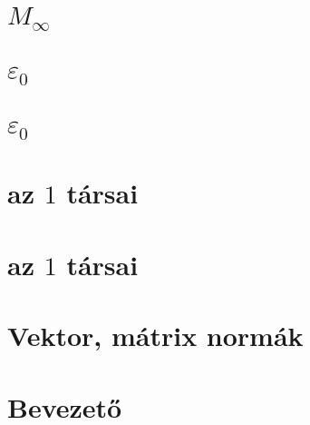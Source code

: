 \begin{spacing}{1.4}
\section*{$M_{\infty}$} \label{DBfloatf2Mo}
\Mo{

}
\vspace{0.5cm}
\newpage
\section*{$\varepsilon_0$} \label{DBfloatf3}
\Fa{

}
\vspace{0.5cm}
\newpage
\section*{$\varepsilon_0$} \label{DBfloatf3Mo}
\Mo{

}
\vspace{0.5cm}
\newpage
\section*{az $1$ társai} \label{DBfloatf4}
\Fa{

}
\vspace{0.5cm}
\newpage
\section*{az $1$ társai} \label{DBfloatf4Mo}
\Mo{

}
\vspace{0.5cm}
\newpage
\section*{Vektor, mátrix normák} \label{DBnorma}
\vspace{0.5cm}
\newpage
\section*{Bevezető} \label{DBnormabev}
\Desc{

}
\vspace{0.5cm}
\newpage

\end{spacing}
